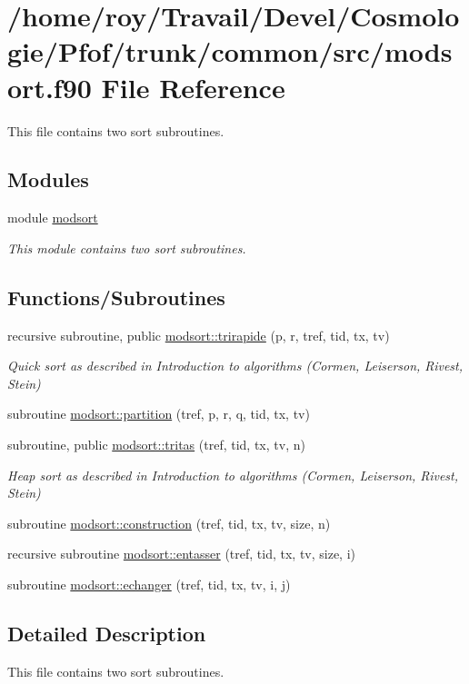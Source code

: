 \hypertarget{modsort_8f90}{}\section{/home/roy/\+Travail/\+Devel/\+Cosmologie/\+Pfof/trunk/common/src/modsort.f90 File Reference}
\label{modsort_8f90}


This file contains two sort subroutines.  


\subsection*{Modules}
\begin{DoxyCompactItemize}
\item 
module \hyperlink{namespacemodsort}{modsort}
\begin{DoxyCompactList}\small\item\em This module contains two sort subroutines. \end{DoxyCompactList}\end{DoxyCompactItemize}
\subsection*{Functions/\+Subroutines}
\begin{DoxyCompactItemize}
\item 
recursive subroutine, public \hyperlink{namespacemodsort_a9c9ed3d1f948bf7023476506e298e0bf}{modsort\+::trirapide} (p, r, tref, tid, tx, tv)
\begin{DoxyCompactList}\small\item\em Quick sort as described in Introduction to algorithms (Cormen, Leiserson, Rivest, Stein) \end{DoxyCompactList}\item 
subroutine \hyperlink{namespacemodsort_a86fab5cf7c126f47a3f7df3d93447784}{modsort\+::partition} (tref, p, r, q, tid, tx, tv)
\item 
subroutine, public \hyperlink{namespacemodsort_a22712b17a572f1af3a89bb0247b6616c}{modsort\+::tritas} (tref, tid, tx, tv, n)
\begin{DoxyCompactList}\small\item\em Heap sort as described in Introduction to algorithms (Cormen, Leiserson, Rivest, Stein) \end{DoxyCompactList}\item 
subroutine \hyperlink{namespacemodsort_abdddab14c10da69038614dfbaf611056}{modsort\+::construction} (tref, tid, tx, tv, size, n)
\item 
recursive subroutine \hyperlink{namespacemodsort_a7cf26a2aded499f04cfddd9a93801356}{modsort\+::entasser} (tref, tid, tx, tv, size, i)
\item 
subroutine \hyperlink{namespacemodsort_aa2757c63708f71eb3b4a4446b4ba6c39}{modsort\+::echanger} (tref, tid, tx, tv, i, j)
\end{DoxyCompactItemize}


\subsection{Detailed Description}
This file contains two sort subroutines. 


